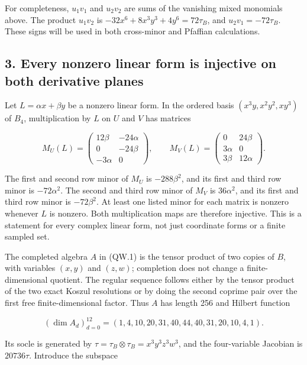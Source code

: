 For completeness, \(u_1v_1\) and \(u_2v_2\) are sums of the vanishing mixed
monomials above. The product \(u_1v_2\) is \(-32x^6+8x^3y^3+4y^6=72\tau_B\),
and \(u_2v_1=-72\tau_B\). These signs will be used in both cross-minor and
Pfaffian calculations.

\subsection{3. Every nonzero linear form is injective on both derivative planes}\label{SF-E848W:s3}

Let \(L=\alpha x+\beta y\) be a nonzero linear form. In the ordered basis
\((x^3y,x^2y^2,xy^3)\) of \(B_4\), multiplication by \(L\) on \(U\) and \(V\) has matrices

\[
 M_U(L)=\begin{pmatrix}
 12\beta&-24\alpha\\
 0&-24\beta\\
 -3\alpha&0
 \end{pmatrix},\qquad
 M_V(L)=\begin{pmatrix}
 0&24\beta\\
 3\alpha&0\\
 3\beta&12\alpha
 \end{pmatrix}.
\tag{QW.8}
\]

The first and second row minor of \(M_U\) is \(-288\beta^2\), and its first
and third row minor is \(-72\alpha^2\). The second and third row minor of
\(M_V\) is \(36\alpha^2\), and its first and third row minor is \(-72\beta^2\).
At least one listed minor for each matrix is nonzero whenever \(L\) is
nonzero. Both multiplication maps are therefore injective. This is
a statement for every complex linear form, not just coordinate forms
or a finite sampled set.

The completed algebra \(A\) in (QW.1) is the tensor product of two copies
of \(B\), with variables \((x,y)\) and \((z,w)\); completion does not change a
finite-dimensional quotient. The regular sequence follows either by
the tensor product of the two exact Koszul resolutions or by doing
the second coprime pair over the first free finite-dimensional factor.
Thus \(A\) has length 256 and Hilbert function

\[
 (\dim A_d)_{d=0}^{12}
   =(1,4,10,20,31,40,44,40,31,20,10,4,1).
\tag{QW.9}
\]

Its socle is generated by \(\tau=\tau_B\otimes\tau_B=x^3y^3z^3w^3\),
and the four-variable Jacobian is \(20736\tau\). Introduce the subspace

